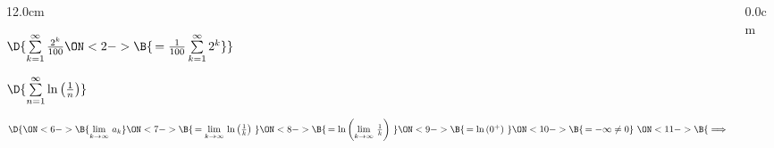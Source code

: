 \begin{frame}
\frametitle{}
\scriptsize
\begin{columns}
\begin{column}{12.0cm}

\vspace{0.2cm}

$\D{\sum \limits_{k = 1}^{\infty} \frac{2^k}{100}
\ON<2->{\B{\, = \frac{1}{100}\sum \limits_{k = 1}^{\infty} 2^k}}}$
\qquad 
{} \quad 
{}

\vspace{3.0cm}

$\D{\sum \limits_{n = 1}^{\infty} \ln \left(\frac{1}{n}\right)}$

\vspace{0.5cm}

$\D{
\ON<6->{\B{\lim \limits_{k \to \infty}\, a_k }}
\ON<7->{\B{\,= \lim \limits_{k \to \infty}\, \ln \left(\frac{1}{k}\right) \,\,}}
\ON<8->{\B{\,= \ln \left(\lim \limits_{k \to \infty}\, \frac{1}{k}\right) \,\,}}
\ON<9->{\B{\,= \ln \left(0^+\right) \,\,}}
\ON<10->{\B{\,= -\infty \ne 0}}
\,\, 
\ON<11->{\B{\implies \quad \{S_N\}}}}$ 

\vspace{6.5cm}

\end{column}
\begin{column}{0.0cm}\end{column}
\end{columns}
\end{frame}


